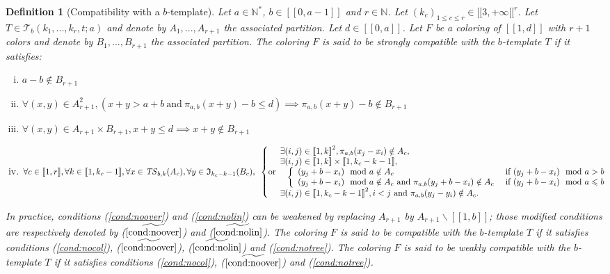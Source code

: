 \documentclass{article}
\newtheorem{definition}{Definition}[section]
\newcommand{\TS}{\mathit{TS}}
\begin{document}
\begin{definition}[Compatibility with a \(b\)-template]
Let \(a \in \mathbb{N}^*\), \(b \in [\![0, a - 1]\!]\) and \(r \in \mathbb{N}\). Let 
\((k_c)_{1 \leqslant c \leqslant r} \in {[\![3, + \infty [\![}^r\). Let \(T \in \mathcal{T}_b(k_1, ..., k_r, t; a)\) 
and denote by \(A_1, ..., A_{r+1}\) the associated partition. Let \(d \in [\![0, a]\!]\). Let \(F\) be a coloring of 
\([\![1, d]\!]\) with \(r +1\) colors and denote by \(B_1, ..., B_{r + 1}\) the associated partition. The coloring 
\(F\) is said to be strongly compatible with the \(b\)-template \(T\) if it satisfies:
\begin{enumerate}[(i)]
\item \label{cond:nocol} \(a - b \notin B_{r + 1}\)
\item \label{cond:noover} \(\forall (x,y) \in A_{r+1}^2, (x + y > a + b ~\text{and}~ \pi_{a, b}(x + y) - b \leqslant d) 
	\implies \pi_{a, b}(x + y) - b \notin B_{r+1}\)
\item \label{cond:nolin} \(\forall (x,y) \in A_{r+1} \times B_{r+1}, x + y \leqslant d \implies x + y  \notin B_{r+1}\)
\item \label{cond:notree} \(\forall c \in [\![1, r]\!], \forall k \in [\![1, k_c-1]\!], \forall x \in \TS_{b, k}(A_c), 
	\forall y \in \mathfrak{I}_{k_c - k - 1}(B_c), \\
	\begin{array}{l}
		\left\{ \text{or} 
		\begin{array}{l}
			\exists (i, j) \in {[\![1, k]\!]}^2, \pi_{a, b}(x_j - x_i) \notin A_c, \\
			\exists (i, j) \in [\![1, k]\!] \times [\![1, k_c - k - 1]\!], \\
			\mspace{15mu}
				\left \{
				\begin{array}{l l}
					(y_j + b - x_i) \mod a \notin A_c & ~\text{if}~ (y_j + b - x_i) \mod a > b \\
					(y_j + b - x_i) \mod a \notin A_c ~\text{and}~ \pi_{a, b}(y_j + b - x_i) \notin A_c & ~\text{if}~ (y_j + b - x_i) 
						\mod a \leqslant b \\
				\end{array}
				\right. \\
			\exists (i, j) \in {[\![1, k_c - k - 1]\!]}^2, i < j ~\text{and}~ \pi_{a, b}(y_j - y_i) \notin A_c.
		\end{array}
		\right.
	\end{array}\)
\end{enumerate}

In practice, conditions (\ref{cond:noover}) and (\ref{cond:nolin}) can be weakened by replacing \(A_{r + 1}\) by 
\(A_{r + 1} \backslash [\![1, b]\!]\); those modified conditions are respectively denoted by 
(\(\widetilde{\ref{cond:noover}}\)) and (\(\widetilde{\ref{cond:nolin}}\)). The coloring \(F\) is said to be compatible 
with the \(b\)-template \(T\) if it satisfies conditions (\ref{cond:nocol}), (\(\widetilde{\ref{cond:noover}}\)), 
(\(\widetilde{\ref{cond:nolin}}\)) and (\ref{cond:notree}). The coloring \(F\) is said to be weakly compatible with the
 \(b\)-template \(T\) if it satisfies conditions (\ref{cond:nocol}), (\(\widetilde{\ref{cond:noover}}\)) and 
(\ref{cond:notree}). 
\end{definition}
\end{document}
